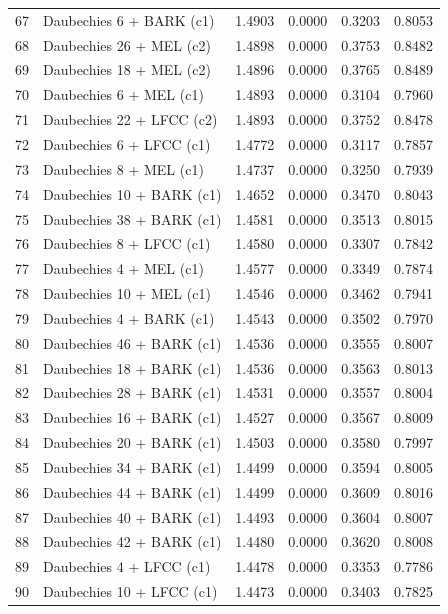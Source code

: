 \begin{longtable}{@{}rlrrrr@{}}
67 & Daubechies 6 + BARK (c1) & 1.4903 & 0.0000 & 0.3203 & 0.8053 \\
68 & Daubechies 26 + MEL (c2) & 1.4898 & 0.0000 & 0.3753 & 0.8482 \\
69 & Daubechies 18 + MEL (c2) & 1.4896 & 0.0000 & 0.3765 & 0.8489 \\
70 & Daubechies 6 + MEL (c1) & 1.4893 & 0.0000 & 0.3104 & 0.7960 \\
71 & Daubechies 22 + LFCC (c2) & 1.4893 & 0.0000 & 0.3752 & 0.8478 \\
72 & Daubechies 6 + LFCC (c1) & 1.4772 & 0.0000 & 0.3117 & 0.7857 \\
73 & Daubechies 8 + MEL (c1) & 1.4737 & 0.0000 & 0.3250 & 0.7939 \\
74 & Daubechies 10 + BARK (c1) & 1.4652 & 0.0000 & 0.3470 & 0.8043 \\
75 & Daubechies 38 + BARK (c1) & 1.4581 & 0.0000 & 0.3513 & 0.8015 \\
76 & Daubechies 8 + LFCC (c1) & 1.4580 & 0.0000 & 0.3307 & 0.7842 \\
77 & Daubechies 4 + MEL (c1) & 1.4577 & 0.0000 & 0.3349 & 0.7874 \\
78 & Daubechies 10 + MEL (c1) & 1.4546 & 0.0000 & 0.3462 & 0.7941 \\
79 & Daubechies 4 + BARK (c1) & 1.4543 & 0.0000 & 0.3502 & 0.7970 \\
80 & Daubechies 46 + BARK (c1) & 1.4536 & 0.0000 & 0.3555 & 0.8007 \\
81 & Daubechies 18 + BARK (c1) & 1.4536 & 0.0000 & 0.3563 & 0.8013 \\
82 & Daubechies 28 + BARK (c1) & 1.4531 & 0.0000 & 0.3557 & 0.8004 \\
83 & Daubechies 16 + BARK (c1) & 1.4527 & 0.0000 & 0.3567 & 0.8009 \\
84 & Daubechies 20 + BARK (c1) & 1.4503 & 0.0000 & 0.3580 & 0.7997 \\
85 & Daubechies 34 + BARK (c1) & 1.4499 & 0.0000 & 0.3594 & 0.8005 \\
86 & Daubechies 44 + BARK (c1) & 1.4499 & 0.0000 & 0.3609 & 0.8016 \\
87 & Daubechies 40 + BARK (c1) & 1.4493 & 0.0000 & 0.3604 & 0.8007 \\
88 & Daubechies 42 + BARK (c1) & 1.4480 & 0.0000 & 0.3620 & 0.8008 \\
89 & Daubechies 4 + LFCC (c1) & 1.4478 & 0.0000 & 0.3353 & 0.7786 \\
90 & Daubechies 10 + LFCC (c1) & 1.4473 & 0.0000 & 0.3403 & 0.7825 \\

\end{longtable}
